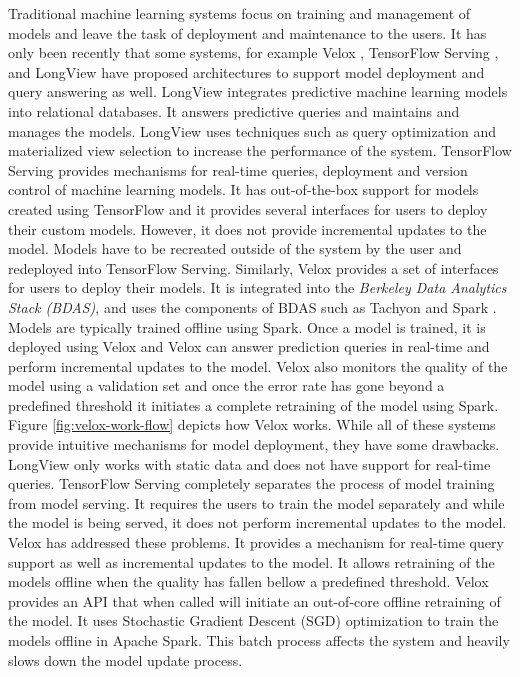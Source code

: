 \documentclass{sig-alternate-05-2015}
\begin{document}
Traditional machine learning systems focus on training and management of models and leave the task of deployment and maintenance to the users. 
It has only been recently that some systems, for example Velox \cite{crankshaw2014missing}, TensorFlow Serving \cite{abadi2016tensorflow}, and LongView \cite{akdere2011case} have proposed architectures to support model deployment and query answering as well. 
LongView integrates predictive machine learning models into relational databases. 
It answers predictive queries and maintains and manages the models.
LongView uses techniques such as query optimization and materialized view selection to increase the performance of the system.
TensorFlow Serving provides mechanisms for real-time queries, deployment and version control of machine learning models.
It has out-of-the-box support for models created using TensorFlow and it provides several interfaces for users to deploy their custom models.
However, it does not provide incremental updates to the model.
Models have to be recreated outside of the system by the user and redeployed into TensorFlow Serving.
Similarly, Velox provides a set of interfaces for users to deploy their models. 
It is integrated into the \textit{Berkeley Data Analytics Stack (BDAS)}, and uses the components of BDAS such as Tachyon \cite{li2014tachyon} and Spark \cite{zaharia2010spark}. 
Models are typically trained offline using Spark. 
Once a model is trained, it is deployed using Velox and Velox can answer prediction queries in real-time and perform incremental updates to the model.
Velox also monitors the quality of the model using a validation set and once the error rate has gone beyond a predefined threshold it initiates a complete retraining of the model using Spark. 
Figure \ref{fig:velox-work-flow} depicts how Velox works. 
While all of these systems provide intuitive mechanisms for model deployment, they have some drawbacks. 
LongView only works with static data and does not have support for real-time queries.
TensorFlow Serving completely separates the process of model training from model serving. 
It requires the users to train the model separately and while the model is being served, it does not perform incremental updates to the model.
Velox has addressed these problems. 
It provides a mechanism for real-time query support as well as incremental updates to the model.
It allows retraining of the models offline when the quality has fallen bellow a predefined threshold.
Velox provides an API that when called will initiate an out-of-core offline retraining of the model.
It uses Stochastic Gradient Descent (SGD) optimization to train the models offline in Apache Spark.
This batch process affects the system and heavily slows down the model update process.
\end{document}
